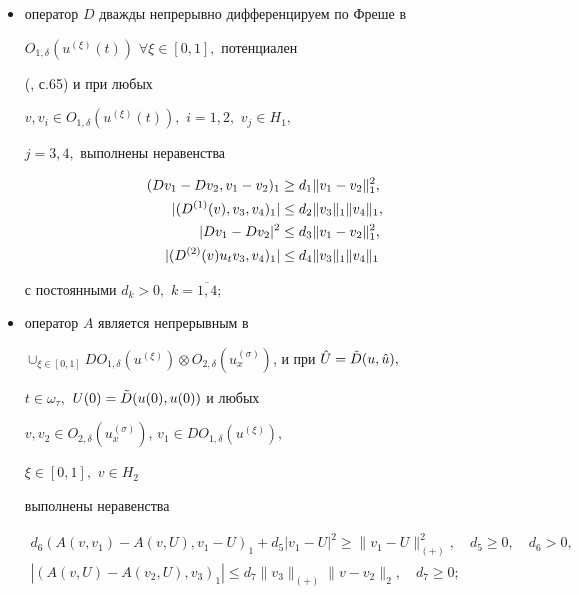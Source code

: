  


\begin{itemize} 


\item[а)] оператор $D$ дважды непрерывно дифференцируем по Фреше в 


$O_{1,\delta}(u^{(\xi)}(t))$ $\forall\xi\in[0,1],$ потенциален  


(\cite{Vai}, с.65) и при любых 


$v,v_i\in O_{1,\delta}(u^{(\xi)}(t)),$ $i=1,2,$ $v_j\in H_1,$ 


$j=3,4,$ выполнены неравенства 


\begin{align} 


(Dv_1-Dv_2,v_1-v_2)_1 &\ge d_1\|v_1-v_2\|_1^2,\\ 


|(D^{(1)}(v),v_3,v_4)_1| &\le d_2\|v_3\|_1 \|v_4\|_1,\\ 


|Dv_1-Dv_2|^2 &\le d_3\|v_1-v_2\|_1^2,\\ 


|(D^{(2)}(v)u_tv_3,v_4)_1| &\le d_4\|v_3\|_1 \|v_4\|_1\notag 


\end{align} 


с постоянными $d_k>0,$ $k=\overline{1,4};$ 


 


\item[b)] оператор $A$ является непрерывным в 


$\cup_{\xi\in[0,1]}DO_{1,\delta}(u^{(\xi)})\otimes 


O_{2,\delta}(u_x^{(\sigma)})$, и при $\Hat U=\Tilde D(u,\Hat u),$ 


$t\in\omega_\tau,$ $U(0)=\Tilde D(u(0),u(0))$ и любых  


$v,v_2\in O_{2,\delta}(u_x^{(\sigma)})$, $v_1\in DO_{1,\delta}(u^{(\xi)}),$ 


$\xi\in [0,1],$ $v\in H_2$ 


выполнены неравенства 


\begin{gather} 


d_6(A(v,v_1)-A(v,U),v_1-U)_1 +d_5|v_1-U|^2 \ge 


\|v_1-U\|^2_{(+)},\quad d_5\ge 0,\quad d_6>0,\\ 


|(A(v,U)-A(v_2,U),v_3)_1| \le d_7\|v_3\|_{(+)}\|v-v_2\|_2,\quad d_7\ge 0; 



\end{gather}
\end{itemize}
